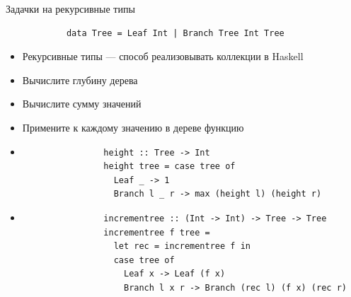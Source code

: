     \begin{frame}[fragile]{Задачки на рекурсивные типы}
        \begin{verbatim}
            data Tree = Leaf Int | Branch Tree Int Tree
        \end{verbatim}
        \begin{itemize}
            \item Рекурсивные типы --- способ реализовывать коллекции в Haskell
            \item[\todo] Вычислите глубину дерева
            \item[\todo] Вычислите сумму значений
            \item[\todo] Примените к каждому значению в дереве функцию
            \item[\answer] \pause
            \begin{verbatim}
                height :: Tree -> Int
                height tree = case tree of
                  Leaf _ -> 1
                  Branch l _ r -> max (height l) (height r)
            \end{verbatim}
            \item[\answer] \pause
            \begin{verbatim}
                incrementree :: (Int -> Int) -> Tree -> Tree
                incrementree f tree =
                  let rec = incrementree f in
                  case tree of
                    Leaf x -> Leaf (f x)
                    Branch l x r -> Branch (rec l) (f x) (rec r)
            \end{verbatim}
        \end{itemize}
    \end{frame}


